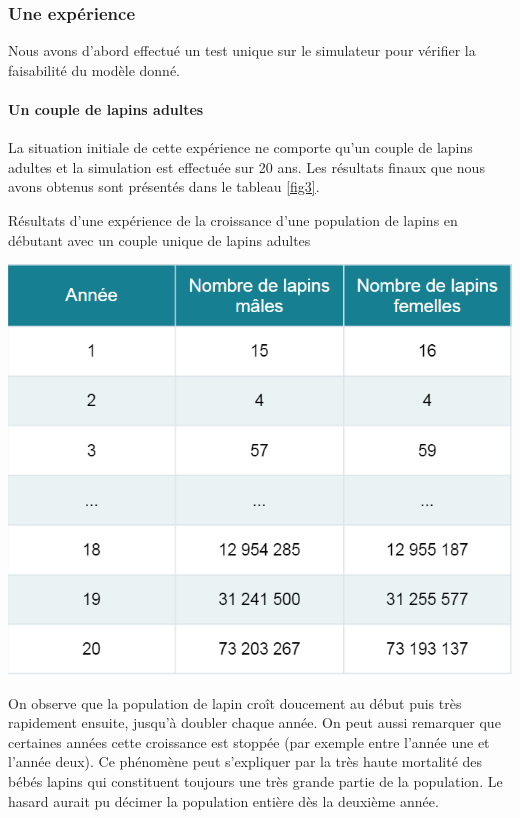 \documentclass[12pt]{article}
\begin{document}
    \subsubsection{Une expérience}
    \par
    Nous avons d'abord effectué un test unique sur le simulateur pour vérifier la faisabilité du modèle donné.\par
    \paragraph{Un couple de lapins adultes}\hspace{0.5cm}
    \newline
    \par La situation initiale de cette expérience ne comporte qu'un couple de lapins adultes et la simulation est effectuée sur 20 ans. Les résultats finaux que nous avons obtenus sont présentés dans le tableau \ref{fig3}.
    \begin{table}[!h]
	    \centering
	    \caption{Résultats d'une expérience de la croissance d'une population de lapins en débutant avec un couple unique de lapins adultes}
        \includegraphics[scale = 0.7]{Photos/lapins1.png}
	    \label{fig3}
	\end{table}
    \par
    On observe que la population de lapin croît doucement au début puis très rapidement ensuite, jusqu'à doubler chaque année. On peut aussi remarquer que certaines années cette croissance est stoppée (par exemple entre l'année une et l'année deux). Ce phénomène peut s'expliquer par la très haute mortalité des bébés lapins qui constituent toujours une très grande partie de la population. Le hasard aurait pu décimer la population entière dès la deuxième année.\\
\end{document}

